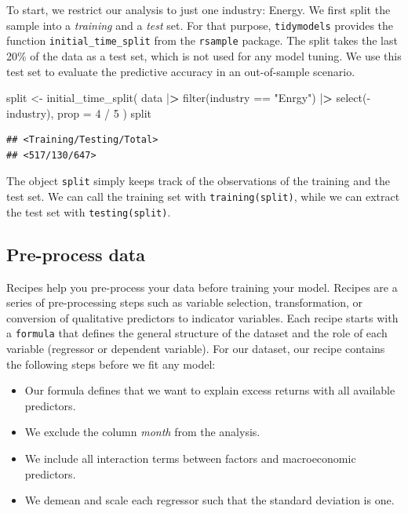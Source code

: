 \documentclass[
]{krantz}
\newenvironment{Shaded}{\begin{snugshade}}{\end{snugshade}}
\newcommand{\AttributeTok}[1]{\textcolor[rgb]{0.61,0.61,0.61}{#1}}
\newcommand{\DecValTok}[1]{\textcolor[rgb]{0.06,0.06,0.06}{#1}}
\newcommand{\ErrorTok}[1]{\textcolor[rgb]{0.14,0.14,0.14}{\textbf{#1}}}
\newcommand{\FunctionTok}[1]{\textcolor[rgb]{0,0,0}{#1}}
\newcommand{\NormalTok}[1]{#1}
\newcommand{\OtherTok}[1]{\textcolor[rgb]{0.37,0.37,0.37}{#1}}
\newcommand{\SpecialCharTok}[1]{\textcolor[rgb]{0,0,0}{#1}}
\newcommand{\StringTok}[1]{\textcolor[rgb]{0.5,0.5,0.5}{#1}}
\providecommand{\tightlist}{%
  \setlength{\itemsep}{0pt}\setlength{\parskip}{0pt}}
\begin{document}
To start, we restrict our analysis to just one industry: Energy. We first split the sample into a \emph{training} and a \emph{test} set.
For that purpose, \texttt{tidymodels} provides the function \texttt{initial\_time\_split} from the \texttt{rsample} package.
The split takes the last 20\% of the data as a test set, which is not used for any model tuning.
We use this test set to evaluate the predictive accuracy in an out-of-sample scenario.

\begin{Shaded}
\begin{Highlighting}[]
\NormalTok{split }\OtherTok{\textless{}{-}} \FunctionTok{initial\_time\_split}\NormalTok{(}
\NormalTok{  data }\SpecialCharTok{|}\ErrorTok{\textgreater{}}
    \FunctionTok{filter}\NormalTok{(industry }\SpecialCharTok{==} \StringTok{"Enrgy"}\NormalTok{) }\SpecialCharTok{|}\ErrorTok{\textgreater{}}
    \FunctionTok{select}\NormalTok{(}\SpecialCharTok{{-}}\NormalTok{industry),}
  \AttributeTok{prop =} \DecValTok{4} \SpecialCharTok{/} \DecValTok{5}
\NormalTok{)}
\NormalTok{split}
\end{Highlighting}
\end{Shaded}

\begin{verbatim}
## <Training/Testing/Total>
## <517/130/647>
\end{verbatim}

The object \texttt{split} simply keeps track of the observations of the training and the test set.
We can call the training set with \texttt{training(split)}, while we can extract the test set with \texttt{testing(split)}.

\hypertarget{pre-process-data}{%
\subsection{Pre-process data}\label{pre-process-data}}

Recipes help you pre-process your data before training your model. Recipes are a series of pre-processing steps such as variable selection, transformation, or conversion of qualitative predictors to indicator variables. Each recipe starts with a \texttt{formula} that defines the general structure of the dataset and the role of each variable (regressor or dependent variable). For our dataset, our recipe contains the following steps before we fit any model:

\begin{itemize}
\tightlist
\item
  Our formula defines that we want to explain excess returns with all available predictors.
\item
  We exclude the column \emph{month} from the analysis.
\item
  We include all interaction terms between factors and macroeconomic predictors.
\item
  We demean and scale each regressor such that the standard deviation is one.
\end{itemize}
\end{document}
